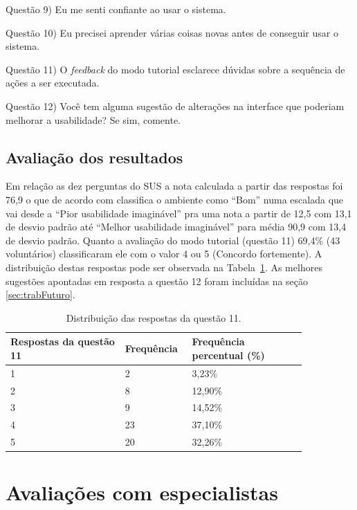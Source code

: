 Questão 9) Eu me senti confiante ao usar o sistema.

Questão 10) Eu precisei aprender várias coisas novas antes de conseguir usar o sistema.

Questão 11) O \textit{feedback} do modo tutorial esclarece dúvidas sobre a sequência de ações a ser executada.

Questão 12) Você tem alguma sugestão de alterações na interface que poderiam melhorar a usabilidade? Se sim, comente.

\subsection{Avaliação dos resultados}
\label{sec:avaliacaoUsabilidde}

Em relação as dez perguntas do \acrshort{SUS} a nota calculada a partir das respostas foi 76,9 o que de acordo com \textcite{BangorAaron2009} classifica o ambiente como ``Bom'' numa escalada que vai desde a ``Pior usabilidade imaginável'' pra uma nota a partir de 12,5 com 13,1 de desvio padrão até ``Melhor usabilidade imaginável'' para média 90,9 com 13,4 de desvio padrão. 
Quanto a avaliação do modo tutorial (questão 11) 69,4\% (43 voluntários) classificaram ele com o valor 4 ou 5 (Concordo fortemente). A distribuição destas respostas pode ser observada na Tabela~\ref{tab:tabelaRespostasModoTutorial}. As melhores sugestões apontadas em resposta a questão 12 foram incluídas na seção \ref{sec:trabFuturo}.

\begin{table}[!ht]
\begin{center}
\caption{Distribuição das respostas da questão 11.}
\label{tab:tabelaRespostasModoTutorial}
\begin{tabular}{|p{0.35\linewidth}|p{0.15\linewidth}|p{0.35\linewidth}|}
\hline
\textbf{Respostas da questão 11} & \textbf{Frequência} & \textbf{Frequência percentual (\%)}\\
\hline\hline
1 & 2 & 3,23\%\\
2 & 8 & 12,90\%\\
3 & 9 & 14,52\%\\
4 & 23 & 37,10\%\\
5 & 20 & 32,26\%\\
\hline
\end{tabular}
\end{center}
\end{table}

\section{Avaliações com especialistas}
\label{sec:testeEspecialistas}

